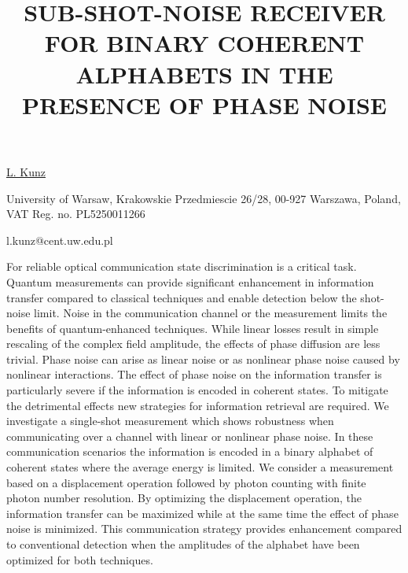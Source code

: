 \title{SUB-SHOT-NOISE RECEIVER FOR BINARY COHERENT ALPHABETS IN THE PRESENCE OF PHASE NOISE}

\underline{L. Kunz}  

{\normalsize{\vspace{-4mm}
University of Warsaw,
Krakowskie Przedmiescie 26/28,
00-927 Warszawa, Poland,
VAT Reg. no. PL5250011266



\email l.kunz@cent.uw.edu.pl}}

For reliable optical communication state discrimination is a critical task. Quantum measurements can provide significant enhancement in information transfer compared to classical techniques and enable detection below the shot-noise limit. Noise in the communication channel or the measurement limits the benefits of quantum-enhanced techniques. While linear losses result in simple rescaling of the complex field amplitude, the effects of phase diffusion are less trivial. Phase noise can arise as linear noise or as nonlinear phase noise caused by nonlinear interactions. The effect of phase noise on the information transfer is particularly severe if the information is encoded in coherent states. To mitigate the detrimental effects new strategies for information retrieval are required. We investigate a single-shot measurement which shows robustness when communicating over a channel with linear or nonlinear phase noise. In these communication scenarios the information is encoded in a binary alphabet of coherent states where the average energy is limited. We consider a measurement based on a displacement operation followed by photon counting with finite photon number resolution. By optimizing the displacement operation, the information transfer can be maximized while at the same time the effect of phase noise is minimized. This communication strategy provides enhancement compared to conventional detection when the amplitudes of the alphabet have been optimized for both techniques.

\vspace{\baselineskip}